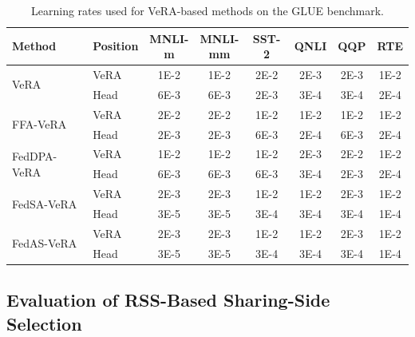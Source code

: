 \documentclass[lettersize,journal]{IEEEtran}
\begin{document}
	\begin{table}[t]
		\centering
		\small
		\setlength{\tabcolsep}{1.0pt}
		\renewcommand{\arraystretch}{1.08}
		\begin{tabular*}{0.98\columnwidth}{@{\extracolsep{\fill}}llcccccc@{}}
			\toprule
			Method & Position & \shortstack{MNLI-\\m} & \shortstack{MNLI-\\mm} & SST-2 & QNLI & QQP & RTE \\
			\midrule
			
			\multirow{2}{*}{VeRA}
			& VeRA & 1E-2 & 1E-2 & 2E-2 & 2E-3 & 2E-3 & 1E-2 \\
			& Head & 6E-3 & 6E-3 & 2E-3 & 3E-4 & 3E-4 & 2E-4 \\
			\midrule
			
			\multirow{2}{*}{FFA-VeRA}
			& VeRA & 2E-2 & 2E-2 & 1E-2 & 1E-2 & 1E-2 & 1E-2 \\
			& Head & 2E-3 & 2E-3 & 6E-3 & 2E-4 & 6E-3 & 2E-4 \\
			\midrule
			
			\multirow{2}{*}{FedDPA-VeRA}
			& VeRA & 1E-2 & 1E-2 & 1E-2 & 2E-3 & 2E-2 & 1E-2 \\
			& Head & 6E-3 & 6E-3 & 6E-3 & 3E-4 & 2E-3 & 2E-4 \\
			\midrule
			
			\multirow{2}{*}{FedSA-VeRA}
			& VeRA & 2E-3 & 2E-3 & 1E-2 & 1E-2 & 2E-3 & 1E-2 \\
			& Head & 3E-5 & 3E-5 & 3E-4 & 3E-4 & 3E-4 & 1E-4 \\
			\midrule
			
			\multirow{2}{*}{FedAS-VeRA}
			& VeRA & 2E-3 & 2E-3 & 1E-2 & 1E-2 & 2E-3 & 1E-2 \\
			& Head & 3E-5 & 3E-5 & 3E-4 & 3E-4 & 3E-4 & 1E-4 \\
			\bottomrule
		\end{tabular*}
		\caption{Learning rates used for VeRA-based methods on the GLUE benchmark.}
		\label{tab:vera_learning_rates}
	\end{table}
	
	\subsection*{Evaluation of RSS-Based Sharing-Side Selection}
	
\end{document}
